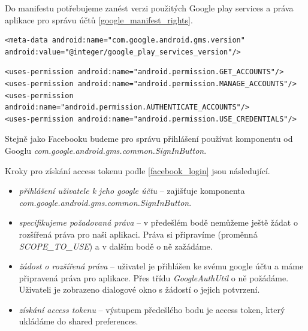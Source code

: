 \documentclass[thesis=B,czech]{FITthesis}[2012/06/26]
\begin{document}
Do manifestu potřebujeme zanést verzi použitých Google play services\cite{google_manifest_version} a práva aplikace pro správu účtů \ref{google_manifest_rights}.

\begin{lstlisting}[label=realization:google_manifest_version,caption=Konfigurace Android manifestu pro Google play services]
<meta-data android:name="com.google.android.gms.version" android:value="@integer/google_play_services_version"/>
\end{lstlisting}

\begin{lstlisting}[label=realization:google_manifest_rights,caption=Konfigurace Android manifestu pro získání práv ke správě účtů]
<uses-permission android:name="android.permission.GET_ACCOUNTS"/>
<uses-permission android:name="android.permission.MANAGE_ACCOUNTS"/>
<uses-permission android:name="android.permission.AUTHENTICATE_ACCOUNTS"/>
<uses-permission android:name="android.permission.USE_CREDENTIALS"/>
\end{lstlisting}

Stejně jako Facebooku budeme pro správu přihlášení používat komponentu od Googlu \textit{com.google.android.gms.common.SignInButton}.\newline

Kroky pro získání access tokenu podle \ref{facebook_login} jsou následující.
\begin{itemize}[nosep]
	\item \textit{přihlášení uživatele k jeho google účtu} -- zajišťuje komponenta \textit{com.google.android.gms.common.SignInButton}.
	\item \textit{specifikujeme požadovaná práva} -- v předešlém bodě nemůžeme ještě žádat o rozšířená práva pro naši aplikaci\cite{android_google_incremental_scopes}. Práva si připravíme (proměnná \textit{SCOPE\_TO\_USE}) a v dalším bodě o ně zažádáme.
	\item \textit{žádost o rozšířená práva} -- uživatel je přihlášen ke svému google účtu a máme připravená práva pro aplikace. Přes třídu \textit{GoogleAuthUtil} o ně požádáme. Uživateli je zobrazeno dialogové okno s žádostí o jejich potvrzení.
	\item \textit{získání access tokenu} -- výstupem předešlého bodu je access token, který ukládáme do shared preferences\cite{android_shared_prefereces}.
\end{itemize}

 
\end{document}
